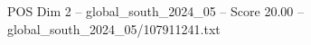 \begin{textsample}{POS Dim 2 – global\_south\_2024\_05 – Score 20.00 – global\_south\_2024\_05/107911241.txt}
\end{textsample}
